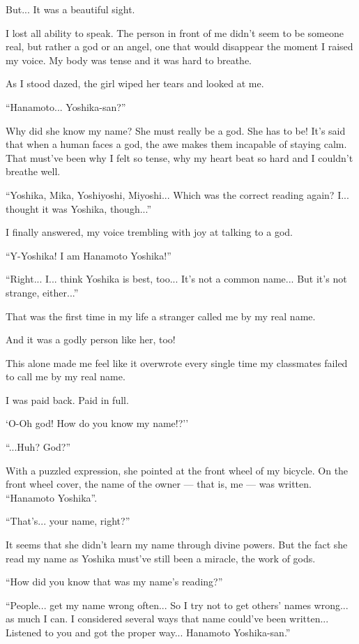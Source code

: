 But... It was a beautiful sight.

I lost all ability to speak. The person in front of me didn't seem to be someone real, but rather a god or an angel, one that would disappear the moment I raised my voice. My body was tense and it was hard to breathe.

As I stood dazed, the girl wiped her tears and looked at me.

``Hanamoto... Yoshika-san?''

Why did she know my name?  She must really be a god. She has to be! It's said that when a human faces a god, the awe makes them incapable of staying calm. That must've been why I felt so tense, why my heart beat so hard and I couldn't breathe well.

``Yoshika, Mika, Yoshiyoshi, Miyoshi... Which was the correct reading again? I... thought it was Yoshika, though...''

I finally answered, my voice trembling with joy at talking to a god.

``Y-Yoshika! I am Hanamoto Yoshika!''

``Right... I... think Yoshika is best, too... It's not a common name... But it's not strange, either...''

That was the first time in my life a stranger called me by my real name.

And it was a godly person like her, too!

This alone made me feel like it overwrote every single time my classmates failed to call me by my real name.

I was paid back. Paid in full.

`O-Oh god! How do you know my name!?''

``...Huh? God?''

With a puzzled expression, she pointed at the front wheel of my bicycle. On the front wheel cover, the name of the owner --- that is, me --- was written. ``Hanamoto Yoshika''.

``That's... your name, right?''

It seems that she didn't learn my name through divine powers. But the fact she read my name as Yoshika must've still been a miracle, the work of gods.

``How did you know that was my name's reading?''

``People... get my name wrong often... So I try not to get others' names wrong... as much I can. I considered several ways that name could've been written... Listened to you and got the proper way... Hanamoto Yoshika-san.''

